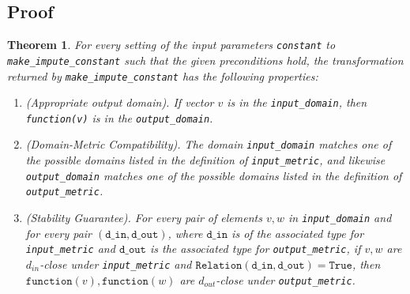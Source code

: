 \documentclass[11pt,a4paper]{article}
\newtheorem{theorem}{Theorem}[section]
\newcommand{\din}{\texttt{d\_in}}
\newcommand{\dout}{\texttt{d\_out}}
\newcommand{\Relation}{\texttt{Relation}}
\newcommand{\True}{\texttt{True}}
\newcommand{\function}{\texttt{function}}
\begin{document}
\subsection{Proof}
\begin{theorem}


For every setting of the input parameters \texttt{constant} to \texttt{make\_impute\_constant} such that the given preconditions hold, the transformation returned by \texttt{make\_impute\_constant} has the following properties:
\begin{enumerate}
    \item \textup{(Appropriate output domain).} If vector $v$ is in the \texttt{input\_domain}, then \texttt{function(v)} is in the \texttt{output\_domain}.
    \item \textup{(Domain-Metric Compatibility).} The domain \texttt{input\_domain} matches one of the possible domains listed in the definition of \texttt{input\_metric}, and likewise \texttt{output\_domain} matches one of the possible domains listed in the definition of \texttt{output\_metric}.
    \item \textup{(Stability Guarantee).} For every pair of elements $v, w$ in \texttt{input\_domain} and for every pair $(\din, \dout)$, where $\din$ is of the associated type for \texttt{input\_metric} and $\dout$ is the associated type for \texttt{output\_metric}, if $v,w$ are $d_{in}$-close under \texttt{input\_metric} and $\Relation(\din, \dout) = \True$, then $\function(v), \function(w)$ are $d_{out}$-close under \texttt{output\_metric}.
\end{enumerate}
\end{theorem}
\end{document}
